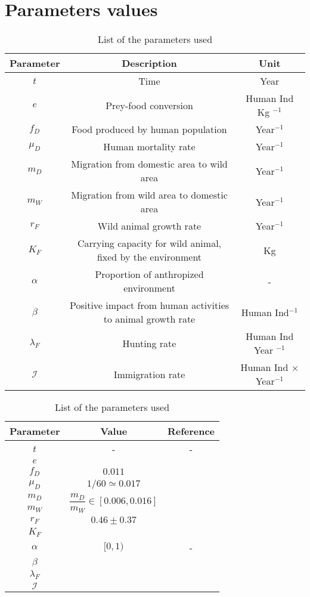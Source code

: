 \documentclass{article}
\newcommand{\lfw}{\lambda_{F}}
\begin{document}
\section{Parameters values}
\begin{table}[ht]
\centering

\begin{tabular}{|c|c|c|}
\hline 
Parameter & Description & Unit \\ 
\hline 
$t$ & Time & Year \\
$e$ & Prey-food conversion & Human Ind Kg $^{-1}$ \\
$f_D$ & Food produced by human population & Year$^{-1}$ \\
$\mu_D$ & Human mortality rate  & Year$^{-1}$ \\
$m_D$ & Migration from domestic area to wild area & Year$^{-1}$ \\
$m_W$ & Migration from wild area to domestic area & Year$^{-1}$ \\
$r_F$ & Wild animal growth rate & Year$^{-1}$ \\
$K_F$ & Carrying capacity for wild animal, fixed by the environment& Kg \\
$\alpha$ & Proportion of anthropized environment & - \\
$\beta$ & Positive impact from human activities to animal growth rate & Human Ind$^{-1}$  \\
$\lfw$ & Hunting rate & Human Ind Year $^{-1}$ \\
$\mathcal{I}$ & Immigration rate & Human Ind $\times$ Year$^{-1}$\\
\hline
\end{tabular}

\begin{tabular}{|c|c|c|}
\hline 
Parameter & Value & Reference \\ 
\hline 
$t$ & - & -\\
$e$ & &\\
$f_D$ & $0.011$ &\\
$\mu_D$ & $1/60 \simeq 0.017$ & \cite{ins_demographie}\\
$m_D$ & \multirow{2}{*}{$\dfrac{m_D}{m_W} \in [0.006, 0.016]$} & \multirow{2}{*}{\cite{avila_interpreting_2019}}\\
$m_W$ & &\\
$r_F$ & $0.46 \pm 0.37$ &\\
$K_F$ & &\\
$\alpha$ & $[0, 1)$ & - \\
$\beta$ & &  \\
$\lfw$ & & \\
$\mathcal{I}$ & &\\
\hline
\end{tabular}

\caption{List of the parameters used}
\end{table}
\end{document}
